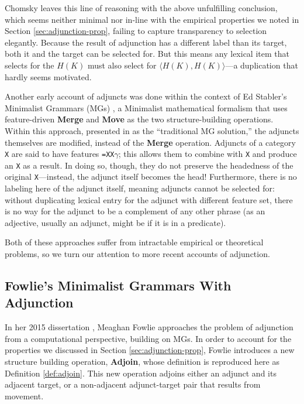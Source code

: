 \documentclass{article}
\begin{document}
Chomsky leaves this line of reasoning with the above unfulfilling
conclusion, which seems neither minimal nor in-line with the empirical
properties we noted in Section \ref{sec:adjunction-prop}, failing to
capture transparency to selection elegantly.  Because the result of
adjunction has a different label than its target, both it and the
target can be selected for.  But this means any lexical item that
selects for the $H(K)$ must also select for
$\langle H(K), H(K) \rangle$---a duplication that hardly seems
motivated.

Another early account of adjuncts was done within the context of Ed
Stabler's Minimalist Grammars (MGs) \cite{stabler2001}, a Minimalist
mathematical formalism that uses feature-driven \textbf{Merge} and
\textbf{Move} as the two structure-building operations.  Within this
approach, presented in \cite{fowlie2015} as the ``traditional MG
solution,'' the adjuncts themselves are modified, instead of the
\textbf{Merge} operation.  Adjuncts of a category \texttt{X} are said
to have features \texttt{=XX}$\gamma$; this allows them to combine
with \texttt{X} and produce an \texttt{X} as a result.  In doing so,
though, they do not preserve the headedness of the original
\texttt{X}---instead, the adjunct itself becomes the head!
Furthermore, there is no labeling here of the adjunct itself, meaning
adjuncts cannot be selected for: without duplicating lexical entry for
the adjunct with different feature set, there is no way for the
adjunct to be a complement of any other phrase (as an adjective,
usually an adjunct, might be if it is in a predicate).

Both of these approaches suffer from intractable empirical or
theoretical problems, so we turn our attention to more recent accounts
of adjunction.


\subsection{Fowlie's Minimalist Grammars With Adjunction}
\label{sec:fowlie-mga}

In her 2015 dissertation \cite{fowlie2015}, Meaghan Fowlie approaches
the problem of adjunction from a computational perspective, building
on MGs.  In order to account for the properties we discussed in
Section \ref{sec:adjunction-prop}, Fowlie introduces a new structure
building operation, \textbf{Adjoin}, whose definition is reproduced
here as Definition \ref{def:adjoin}.  This new operation adjoins
either an adjunct and its adjacent target, or a non-adjacent
adjunct-target pair that results from movement.
\end{document}
